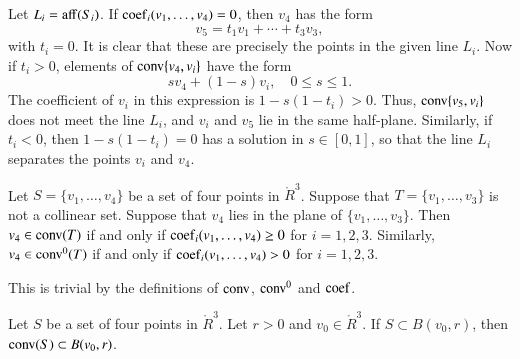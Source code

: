 \begin{tarskidata}
\begin{tarski}
\begin{proved}
  Let $L_i ={\operatorname{aff}}(S_i)$.
If ${\operatorname{coef}}_i(v_1,\ldots,v_4)=0$, then $v_4$
has the form
	$$
	v_5 = t_1 v_1 + \cdots + t_3 v_3,
	$$
with $t_i=0$.  It is clear that these are
precisely the points in the given line $L_i$.
Now if $t_i>0$,
elements of
${\operatorname{conv}}\{v_4,v_i\}$ have the form
	$$s v_4 + (1-s) v_i,\quad 0\le s \le 1.$$
The coefficient of $v_i$ in this expression
is $1-s(1-t_i)>0$.  Thus, ${\operatorname{conv}}\{v_5,v_i\}$
does not meet the line $L_i$, and $v_i$ and $v_5$
lie in the same half-plane.  Similarly,
if $t_i<0$, then $1-s(1-t_i)=0$ has a solution
in $s\in[0,1]$, so that the line $L_i$ separates the
points $v_i$ and $v_4$.
\swallowed\end{proved}
\end{tarski}




\begin{tarski}

\begin{lemma}
Let $S=\{v_1,\ldots,v_4\}$ be
a set of four points in $\ring{R}^3$.  Suppose
that $T=\{v_1,\ldots,v_3\}$ is not a collinear
set. 
Suppose that $v_4$ lies in the plane of
$\{v_1,\ldots,v_3\}$.  
 Then $v_4\in{\operatorname{conv}}(T)$ if and only
if  
${\operatorname{coef}}_i(v_1,\ldots,v_4)\ge0$ 
for $i=1,2,3$.
Similarly, $v_4\in{\operatorname{conv}}^0(T)$ if and only
if  
${\operatorname{coef}}_i(v_1,\ldots,v_4)>0$ 
for $i=1,2,3$.
\end{lemma}

\begin{proved}  This is trivial by the definitions
of ${\operatorname{conv}}$, ${\operatorname{conv}}^0$ and ${\operatorname{coef}}$.
\swallowed\end{proved}
\end{tarski}





\begin{tarski}

\begin{lemma}
Let $S$ be a set of four points in $\ring{R}^3$.
Let $r>0$ and $v_0\in\ring{R}^3$.  If $S\subset B(v_0,r)$, then
${\operatorname{conv}}(S)\subset B(v_0,r)$.
\end{lemma}


\end{tarski}
\end{tarskidata}
